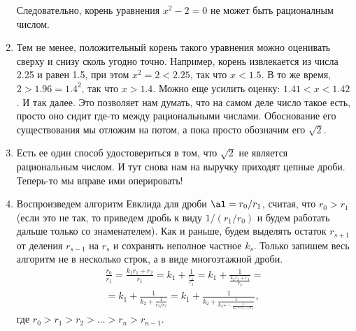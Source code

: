 \begin{enumerate}
Следовательно, корень уравнения $x^2-2=0$ не может быть рационалным числом.
\item Тем не менее, положительный корень такого уравнения можно оценивать сверху и снизу сколь угодно точно. Например, корень извлекается из числа 2.25 и равен 1.5, при этом $x^2=2<2.25$, так что $x<1.5$. В то же время, $2>1.96=1.4^2$, так что $x>1.4$. Можно еще усилить оценку: $1.41<x<1.42$. И так далее. Это позволяет нам думать, что на самом деле число такое есть, просто оно сидит где-то между рациональными числами. Обоснование его существования мы отложим на потом, а пока просто обозначим его $\sqrt 2$.
\item Есть ее один способ удостовериться в том, что $\sqrt 2$ не является рациональным числом. И тут снова нам на выручку приходят цепные дроби. Теперь-то мы вправе ими оперировать!
\item Воспроизведем алгоритм Евклида для дроби $\al = r_0/r_1$, считая, что $r_0>r_1$ (если это не так, то приведем дробь к виду $1/(r_1/r_0)$ и будем работать дальше только со знаменателем). Как и раньше, будем выделять остаток $r_{s+1}$ от деления $r_{s-1}$ на $r_s$ и сохранять неполное частное $k_s$. Только запишем весь алгоритм не в несколько строк, а в виде многоэтажной дроби. 
\begin{multline*}
\frac{r_0}{r_1} = \frac{k_1r_1+r_2}{r_1} = \boxed{k_1}+\frac{1}{\frac{r_1}{r_2}} =
\boxed{k_1} + \frac{1}{\frac{k_2r_2+r_3}{r_2}} =  \\
= \boxed{k_1} + \frac{1}{\boxed{k_2} + \frac{1}{r_3/r_2}} = 
\boxed{k_1} + \frac{1}{\boxed{k_2} + \frac{1}{\boxed{k_3} + \ddots \frac{1}{\boxed{k_n}+r_{n+1}/r_n}}},
\end{multline*}
где $r_0>r_1>r_2>\dots>r_n>r_{n-1}$.


\end{enumerate}
